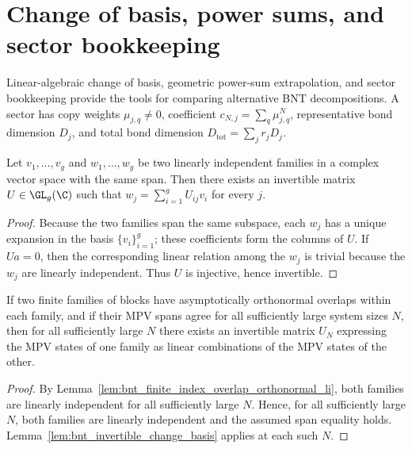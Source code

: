 \section{Change of basis, power sums, and sector bookkeeping}
\label{sec:app_bnt_power_sector}

Linear-algebraic change of basis, geometric power-sum extrapolation, and sector
bookkeeping provide the tools for comparing alternative BNT decompositions. A
sector has copy weights $\mu_{j,q}\ne0$, coefficient
$c_{N,j}=\sum_q\mu_{j,q}^N$, representative bond dimension $D_j$, and total
bond dimension $D_{\mathrm{tot}}=\sum_j r_jD_j$.

\begin{lemma}
    \label{lem:bnt_invertible_change_basis}
    \leanok
    Let $v_1, \ldots, v_g$ and $w_1, \ldots, w_g$ be two linearly independent
    families in a complex vector space with the same span. Then there exists an
    invertible matrix $U \in \GL_g(\C)$ such that
    $w_j = \sum_{i=1}^g U_{ij} v_i$ for every $j$.
\end{lemma}

\begin{proof}\leanok
    Because the two families span the same subspace, each $w_j$ has a unique
    expansion in the basis $\{v_i\}_{i=1}^g$; these coefficients form the
    columns of $U$. If $U a = 0$, then the corresponding linear relation among
    the $w_j$ is trivial because the $w_j$ are linearly independent. Thus $U$
    is injective, hence invertible.
\end{proof}

\begin{lemma}
    \label{lem:bnt_eventual_change_basis}
    \leanok
    If two finite families of blocks have asymptotically orthonormal overlaps
    within each family, and if their MPV spans agree for all sufficiently large
    system sizes $N$, then for all sufficiently large $N$ there exists an
    invertible matrix $U_N$ expressing the MPV states of one family as linear
    combinations of the MPV states of the other.
\end{lemma}

\begin{proof}\leanok{}
    By Lemma~\ref{lem:bnt_finite_index_overlap_orthonormal_li}, both families are
    linearly independent for all sufficiently large $N$. Hence, for all
    sufficiently large $N$, both families are linearly independent and the
    assumed span equality holds. Lemma~\ref{lem:bnt_invertible_change_basis}
    applies at each such $N$.
\end{proof}

